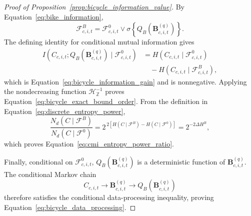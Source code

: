 \begin{proof}[Proof of Proposition~\ref{prop:bicycle_information_value}]
By Equation~\eqref{eq:bike_information},
\[
\mathcal{F}^{B}_{c,i,t}
=
\mathcal{F}^{0}_{c,i,t}
\vee
\sigma\!\left\{Q_B(\mathbf{B}^{(q)}_{c,i,t})\right\}.
\]
The defining identity for conditional mutual information gives
\begin{align*}
I\!\left(
C_{c,i,t};
Q_B(\mathbf{B}^{(q)}_{c,i,t})
\mid\mathcal{F}^{0}_{c,i,t}
\right)
&=
H(C_{c,i,t}\mid\mathcal{F}^{0}_{c,i,t})\\
&\quad-
H(C_{c,i,t}\mid\mathcal{F}^{B}_{c,i,t}),
\end{align*}
which is Equation~\eqref{eq:bicycle_information_gain} and is nonnegative.
Applying the nondecreasing function
\(\mathcal{H}_{\mathbb{Z}}^{-1}\) proves
Equation~\eqref{eq:bicycle_exact_bound_order}. From the definition in
Equation~\eqref{eq:discrete_entropy_power},
\[
\frac{N_d(C\mid\mathcal{F}^{B})}
{N_d(C\mid\mathcal{F}^{0})}
=
2^{\,2[H(C\mid\mathcal{F}^{B})-H(C\mid\mathcal{F}^{0})]}
=
2^{-2\Delta H^B},
\]
which proves Equation~\eqref{eq:cmi_entropy_power_ratio}.

Finally, conditional on \(\mathcal{F}^{0}_{c,i,t}\),
\(Q_B(\mathbf{B}^{(q)}_{c,i,t})\) is a deterministic function of
\(\mathbf{B}^{(q)}_{c,i,t}\). The conditional Markov chain
\[
C_{c,i,t}
\longrightarrow
\mathbf{B}^{(q)}_{c,i,t}
\longrightarrow
Q_B(\mathbf{B}^{(q)}_{c,i,t})
\]
therefore satisfies the conditional data-processing inequality, proving
Equation~\eqref{eq:bicycle_data_processing}.
\end{proof}
